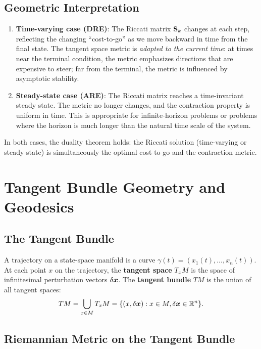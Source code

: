 \subsection{Geometric Interpretation}

\begin{enumerate}
\item \textbf{Time-varying case (DRE)}: The Riccati matrix $\mathbf{S}_k$ changes at each step, reflecting the changing
      ``cost-to-go'' as we move backward in time from the final state. The tangent space metric is \textit{adapted to the
      current time}: at times near the terminal condition, the metric emphasizes directions that are expensive to steer;
      far from the terminal, the metric is influenced by asymptotic stability.

\item \textbf{Steady-state case (ARE)}: The Riccati matrix reaches a time-invariant steady state. The metric no longer
      changes, and the contraction property is uniform in time. This is appropriate for infinite-horizon problems or
      problems where the horizon is much longer than the natural time scale of the system.
\end{enumerate}

In both cases, the duality theorem holds: the Riccati solution (time-varying or steady-state) is simultaneously the optimal
cost-to-go and the contraction metric.

\section{Tangent Bundle Geometry and Geodesics}

\subsection{The Tangent Bundle}

A trajectory on a state-space manifold is a curve $\gamma(t) = (x_1(t), \ldots, x_n(t))$. At each point $x$ on the trajectory,
the \textbf{tangent space} $T_x M$ is the space of infinitesimal perturbation vectors $\delta\bm{x}$. The \textbf{tangent bundle}
$TM$ is the union of all tangent spaces:
\begin{equation}
TM = \bigcup_{x \in M} T_x M = \{(x, \delta\bm{x}) : x \in M, \delta\bm{x} \in \mathbb{R}^n\}.
\label{eq:ch6:tangent-bundle}
\end{equation}

\subsection{Riemannian Metric on the Tangent Bundle}

